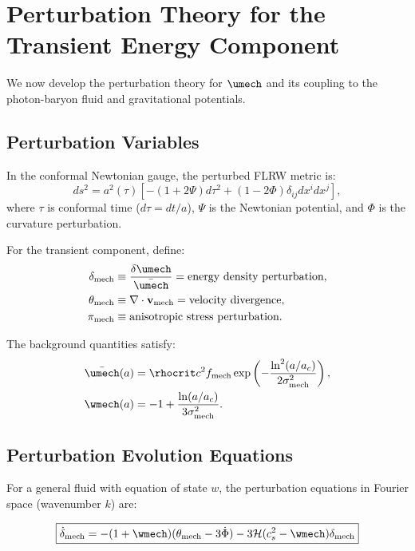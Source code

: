 \section{Perturbation Theory for the Transient Energy Component}
\label{sec:perturbations}

We now develop the perturbation theory for $\umech$ and its coupling to the photon-baryon fluid and gravitational potentials.

\subsection{Perturbation Variables}
\label{sec:perturbation_variables}

In the conformal Newtonian gauge, the perturbed FLRW metric is:
\begin{equation}
ds^2 = a^2(\tau)\left[ -(1+2\Psi)d\tau^2 + (1-2\Phi)\delta_{ij}dx^i dx^j \right],
\end{equation}
where $\tau$ is conformal time ($d\tau = dt/a$), $\Psi$ is the Newtonian potential, and $\Phi$ is the curvature perturbation.

For the transient component, define:
\begin{align}
\delta_{\mathrm{mech}} &\equiv \frac{\delta\umech}{\bar{\umech}} = \text{energy density perturbation}, \label{eq:delta_mech_def} \\
\theta_{\mathrm{mech}} &\equiv \nabla \cdot \mathbf{v}_{\mathrm{mech}} = \text{velocity divergence}, \label{eq:theta_mech_def} \\
\pi_{\mathrm{mech}} &\equiv \text{anisotropic stress perturbation}. \label{eq:pi_mech_def}
\end{align}

The background quantities satisfy:
\begin{align}
\bar{\umech}(a) &= \rhocrit c^2 \fmech \exp\left(-\frac{\ln^2(a/\ac)}{2\sigmamech^2}\right), \\
\wmech(a) &= -1 + \frac{\ln(a/\ac)}{3\sigmamech^2}.
\end{align}

\subsection{Perturbation Evolution Equations}
\label{sec:perturbation_evolution}

For a general fluid with equation of state $w$, the perturbation equations in Fourier space (wavenumber $k$) are:

\begin{equation}
\label{eq:delta_evolution}
\boxed{\dot{\delta}_{\mathrm{mech}} = -(1+\wmech)(\theta_{\mathrm{mech}} - 3\dot{\Phi}) - 3\mathcal{H}(c_s^2 - \wmech)\delta_{\mathrm{mech}}}
\end{equation}


